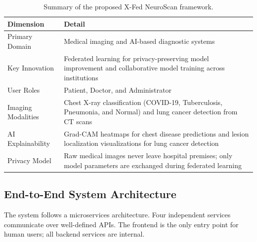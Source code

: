 \begin{table}[htbp]
	\centering
	\caption{Summary of the proposed X-Fed NeuroScan framework.}
	\label{tab:framework_summary}
	\begin{tabular}{|p{4cm}|p{9cm}|}
		\hline
		\textbf{Dimension} & \textbf{Detail} \\
		\hline
		Primary Domain & Medical imaging and AI-based diagnostic systems \\
		\hline
		Key Innovation & Federated learning for privacy-preserving model improvement and collaborative model training across institutions \\
		\hline
		User Roles & Patient, Doctor, and Administrator \\
		\hline
		Imaging Modalities & Chest X-ray classification (COVID-19, Tuberculosis, Pneumonia, and Normal) and lung cancer detection from CT scans \\
		\hline
		AI Explainability & Grad-CAM heatmaps for chest disease predictions and lesion localization visualizations for lung cancer detection \\
		\hline
		Privacy Model & Raw medical images never leave hospital premises; only model parameters are exchanged during federated learning \\
		\hline
	\end{tabular}
\end{table}

\subsection{End-to-End System Architecture}The system follows a microservices architecture. Four independent services communicate over well-defined APIs. The frontend is the only entry point for human users; all backend services are internal.

